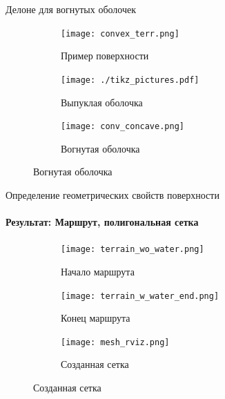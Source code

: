 \begin{frame}[t]{Делоне для вогнутых оболочек}
    \begin{figure}[H]
        \begin{subfigure}[t]{0.3\textwidth}
            \centering\texttt{[image: convex\_terr.png]}
            \caption*{Пример поверхности}
        \end{subfigure}
        \hfill
        \begin{subfigure}[t]{0.33\textwidth}
            \centering
            \centering\texttt{[image: ./tikz\_pictures.pdf]}
            \caption*{Выпуклая оболочка}
        \end{subfigure}
        \hfill
        \begin{subfigure}[t]{0.33\textwidth}
            \centering\texttt{[image: conv\_concave.png]}
            \caption*{Вогнутая оболочка}
        \end{subfigure}

    \end{figure}
\end{frame}

\begin{frame}[t]{Определение геометрических свойств поверхности}
    \framesubtitle{Результат: Маршрут, полигональная сетка}
    \begin{figure}[H]
        \begin{subfigure}[t]{0.36\textwidth}
            \centering\texttt{[image: terrain\_wo\_water.png]}
            \caption*{Начало маршрута}
        \end{subfigure}
        \begin{subfigure}[t]{0.36\textwidth}
            \centering\texttt{[image: terrain\_w\_water\_end.png]}
            \caption*{Конец маршрута}
        \end{subfigure}
        \begin{subfigure}[t]{0.26\textwidth}
            \centering\texttt{[image: mesh\_rviz.png]}
            \caption*{Созданная сетка}
        \end{subfigure}
    \end{figure}


\end{frame}

